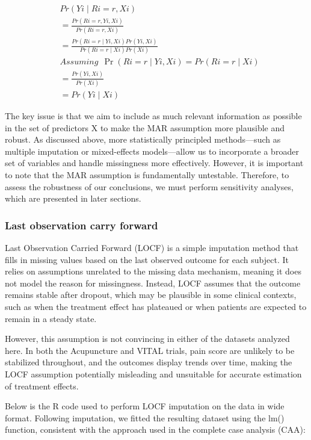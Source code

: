 \documentclass{article}
\begin{document}
\begin{align*}
  & Pr(Yi \mid Ri=r, Xi) \\ 
  & = \displaystyle \frac{Pr(Ri=r,Yi,Xi)}{Pr(Ri=r,Xi)} \\
  & = \displaystyle \frac{Pr(Ri=r \mid Yi,Xi)Pr(Yi,Xi)}{Pr(Ri=r \mid Xi)Pr(Xi)} 
  \\
  & Assuming \ \ \Pr(Ri=r \mid Yi, Xi) = Pr(Ri=r \mid Xi) \\
  & = \displaystyle \frac{Pr(Yi,Xi)}{Pr(Xi)} \\
  & = Pr(Yi \mid Xi)
  \end{align*}

The key issue is that we aim to include as much relevant information as
possible in the set of predictors X to make the MAR assumption more
plausible and robust. As discussed above, more statistically principled
methods---such as multiple imputation or mixed-effects models---allow us
to incorporate a broader set of variables and handle missingness more
effectively. However, it is important to note that the MAR assumption is
fundamentally untestable. Therefore, to assess the robustness of our
conclusions, we must perform sensitivity analyses, which are presented
in later sections.

\subsubsection{Last observation carry
forward}\label{last-observation-carry-forward}

Last Observation Carried Forward (LOCF) is a simple imputation method
that fills in missing values based on the last observed outcome for each
subject. It relies on assumptions unrelated to the missing data
mechanism, meaning it does not model the reason for missingness.
Instead, LOCF assumes that the outcome remains stable after dropout,
which may be plausible in some clinical contexts, such as when the
treatment effect has plateaued or when patients are expected to remain
in a steady state.

However, this assumption is not convincing in either of the datasets
analyzed here. In both the Acupuncture and VITAL trials, pain score are
unlikely to be stabilized throughout, and the outcomes display trends
over time, making the LOCF assumption potentially misleading and
unsuitable for accurate estimation of treatment effects.

Below is the R code used to perform LOCF imputation on the data in wide
format. Following imputation, we fitted the resulting dataset using the
lm() function, consistent with the approach used in the complete case
analysis (CAA):
\end{document}
